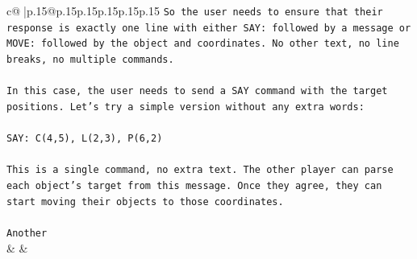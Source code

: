 \documentclass{article}
\begin{document}
{\begin{supertabular}{c@{$\;$}|p{.15\linewidth}@{}p{.15\linewidth}p{.15\linewidth}p{.15\linewidth}p{.15\linewidth}p{.15\linewidth}}
{{{\texttt{So the user needs to ensure that their response is exactly one line with either SAY: followed by a message or MOVE: followed by the object and coordinates. No other text, no line breaks, no multiple commands.} \\
\\ 
\texttt{In this case, the user needs to send a SAY command with the target positions. Let's try a simple version without any extra words:} \\
\\ 
\texttt{SAY: C(4,5), L(2,3), P(6,2)} \\
\\ 
\texttt{This is a single command, no extra text. The other player can parse each object's target from this message. Once they agree, they can start moving their objects to those coordinates.} \\
\\ 
\texttt{Another} \\
            }
        }
    }
    & & \\ \\


\end{supertabular}}
\end{document}
